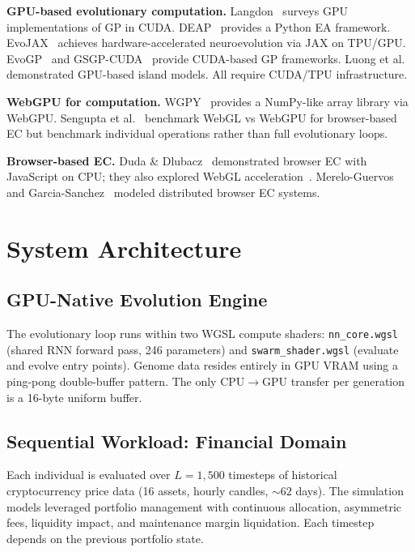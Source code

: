 \documentclass[sigconf,nonacm]{acmart}
\begin{document}
\textbf{GPU-based evolutionary computation.} Langdon~\cite{langdon2010} surveys GPU implementations of GP in CUDA. DEAP~\cite{fortin2012} provides a Python EA framework. EvoJAX~\cite{tang2022} achieves hardware-accelerated neuroevolution via JAX on TPU/GPU. EvoGP~\cite{wu2025} and GSGP-CUDA~\cite{trujillo2022} provide CUDA-based GP frameworks. Luong et al.~\cite{luong2010} demonstrated GPU-based island models. All require CUDA/TPU infrastructure.

\textbf{WebGPU for computation.} WGPY~\cite{hidaka2025} provides a NumPy-like array library via WebGPU. Sengupta et al.~\cite{sengupta2025} benchmark WebGL vs WebGPU for browser-based EC but benchmark individual operations rather than full evolutionary loops.

\textbf{Browser-based EC.} Duda \& Dlubacz~\cite{duda2013b} demonstrated browser EC with JavaScript on CPU; they also explored WebGL acceleration~\cite{duda2013a}. Merelo-Guervos and Garcia-Sanchez~\cite{merelo2015} modeled distributed browser EC systems.

\section{System Architecture}

\subsection{GPU-Native Evolution Engine}

The evolutionary loop runs within two WGSL compute shaders: \texttt{nn\_core.wgsl} (shared RNN forward pass, 246 parameters) and \texttt{swarm\_shader.wgsl} (evaluate and evolve entry points). Genome data resides entirely in GPU VRAM using a ping-pong double-buffer pattern. The only CPU$\to$GPU transfer per generation is a 16-byte uniform buffer.

\subsection{Sequential Workload: Financial Domain}

Each individual is evaluated over $L = 1{,}500$ timesteps of historical cryptocurrency price data (16 assets, hourly candles, ${\sim}62$ days). The simulation models leveraged portfolio management with continuous allocation, asymmetric fees, liquidity impact, and maintenance margin liquidation. Each timestep depends on the previous portfolio state.
\end{document}
